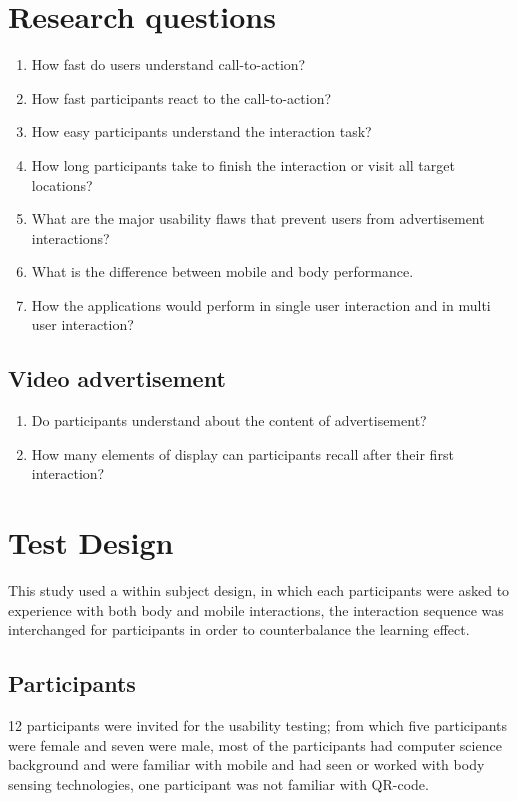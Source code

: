 \section{Research questions}

\begin{enumerate}
\item	How fast do users understand call-to-action?
\item	How fast participants react to the call-to-action?
\item	How easy participants understand the interaction task?
\item	How long participants take to finish the interaction or visit all target locations?
\item	What are the major usability flaws that prevent users from advertisement interactions?
\item	What is the difference between mobile and body performance.
\item   How the applications would perform in single user interaction and in multi user interaction?
\end{enumerate}

\subsection{Video advertisement}
\begin{enumerate}
\item	Do participants understand about the content of advertisement?
\item	How many elements of display can participants recall after their first interaction?
\end{enumerate}


\section{Test Design}
This study used a within subject design, in which each participants were asked to experience with both body and mobile interactions, the interaction sequence was interchanged for participants in order to counterbalance the learning effect.


\subsection {Participants}
12 participants were invited for the usability testing; from which five participants were female and seven were male, most of the participants had computer science background and were familiar with mobile and had seen or worked with body sensing technologies, one participant was not familiar with QR-code.

